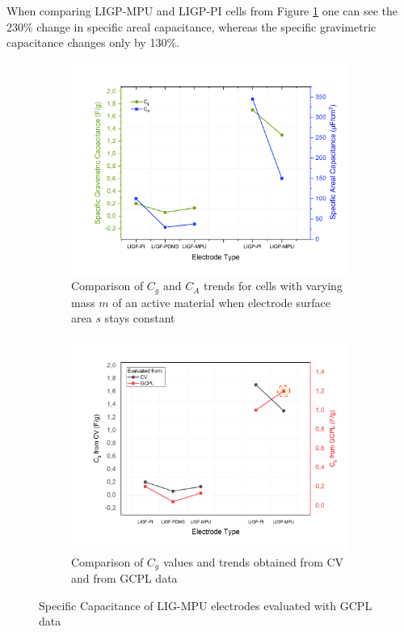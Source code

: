  When comparing LIGP-MPU and LIGP-PI cells from Figure \ref{fig:Cg-vs-Ca} one can see the 230$\%$ change in specific areal capacitance, whereas the  specific gravimetric capacitance changes only by 130$\%$.

\begin{figure}[H]
\begin{subfigure}{0.49\textwidth}
\includegraphics[width=1\textwidth]{Figures/Results/Electrochemistry/Comparisons/Gravimetric-vs-Areal-Capacitance-Change.jpg}
\medskip
\captionsetup{width=0.9\linewidth}
\caption{Comparison of $C_g$ and $C_A$ trends for cells with varying mass $m$ of an active material when electrode surface area $s$ stays constant}
\label{fig:Cg-vs-Ca}
\end{subfigure}
\begin{subfigure}{0.49\textwidth}
\includegraphics[width=1\textwidth]{Figures/Results/Electrochemistry/Comparisons/Gravim-Cap-CV-GCPL.jpg}
\medskip
\captionsetup{width=0.9\linewidth}
\caption{Comparison of $C_g$ values and trends obtained from CV and from GCPL data}
\label{fig:CV-vs-GCPL-final}
\end{subfigure}
\medskip
\caption{Specific Capacitance of LIG-MPU electrodes evaluated with GCPL data}
\label{fig:Capacitances-discuss}
\end{figure}


